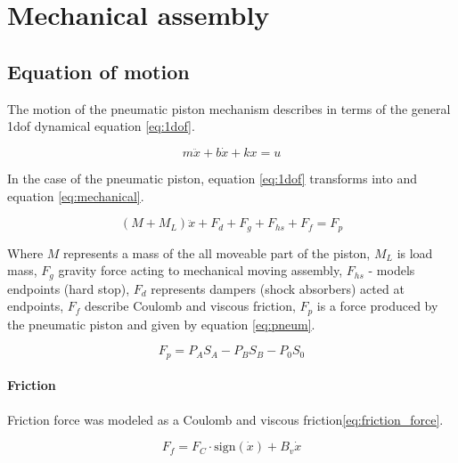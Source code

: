 \section{Mechanical assembly}
\subsection{Equation of motion}

The motion of the pneumatic piston mechanism describes in terms of the
general 1dof dynamical equation \ref{eq:1dof}. 

\begin{equation}
    m\ddot{x} + b\dot{x} + kx = u
    \label{eq:1dof}
\end{equation}

In the case of the pneumatic piston, equation \ref{eq:1dof}
transforms into and equation \ref{eq:mechanical}.

\begin{equation}
    (M + M_L) \ddot{x} + F_{d} + F_g + F_{hs} + F_f  = F_p
    \label{eq:mechanical}
\end{equation}

Where $M$ represents a mass of the all moveable part of the piston,
$M_L$ is load mass, $F_g$ gravity force acting to mechanical moving assembly,
$F_{hs}$ - models endpoints (hard stop),
$F_{d}$ represents dampers (shock absorbers) acted at endpoints,
$F_f$ describe Coulomb and viscous friction,
$F_{p}$ is a force produced by the pneumatic piston and given by equation \ref{eq:pneum}.

\begin{equation}
    F_p = P_A S_A - P_B S_B - P_0 S_0
    \label{eq:pneum}
\end{equation}

\paragraph{Friction} Friction force was modeled as a Coulomb and viscous
friction\ref{eq:friction_force}.

\begin{equation}
    F_f = F_C \cdot \text{sign}(\dot{x}) + B_v \dot{x}
    \label{eq:friction_force}
\end{equation}


